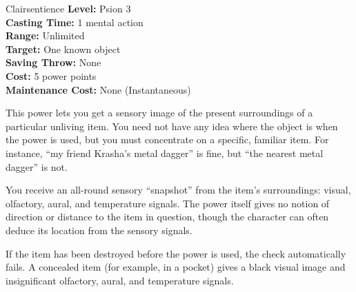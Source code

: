{Clairsentience}
{
	\textbf{Level:}
	Psion 3\\
	\textbf{Casting Time:}
	1 mental action\\
	\textbf{Range:}
	Unlimited\\
	\textbf{Target:}
	One known object\\
	\textbf{Saving Throw:}
	None\\
	\textbf{Cost:}
	5 power points\\
	\textbf{Maintenance Cost:}
	None (Instantaneous)\\
}
{
	This power lets you get a sensory image of the present surroundings of a particular unliving item. You need not have any idea where the object is when the power is used, but you must concentrate on a specific, familiar item. For instance, ``my friend Krasha's metal dagger'' is fine, but ``the nearest metal dagger'' is not.

	You receive an all-round sensory ``snapshot'' from the item's surroundings: visual,
	olfactory, aural, and temperature signals. The power itself gives no notion of direction or distance to the item in question, though the character can often deduce its location from the sensory signals.

	If the item has been destroyed before the power is used, the check automatically fails. A concealed item (for example, in a pocket) gives a black visual image and insignificant  olfactory, aural, and temperature signals.
}